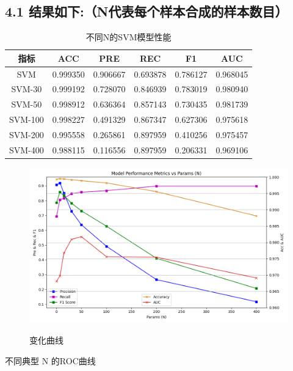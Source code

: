 \documentclass[8pt]{article}
\begin{document}
\subsection*{4.1 结果如下:（N代表每个样本合成的样本数目）}
\begin{table}[H]
    \centering
    \caption{不同N的SVM模型性能}
    \begin{tabular}{cccccc}
    \toprule
    指标 & ACC & PRE & REC & F1 & AUC \\
    \midrule
    SVM & 0.999350 & 0.906667 & 0.693878 & 0.786127 & 0.968045\\
    \midrule
    SVM-30 & 0.999192 & 0.728070 & 0.846939 & 0.783019 & 0.980940\\
    \midrule
    SVM-50 & 0.998912 & 0.636364 & 0.857143 & 0.730435 & 0.981739\\
    \midrule
    SVM-100 & 0.998227 & 0.491329 & 0.867347 & 0.627306 & 0.975618\\
    \midrule
    SVM-200 & 0.995558 & 0.265861 & 0.897959 & 0.410256 & 0.975457\\
    \midrule
    SVM-400 & 0.988115 & 0.116556 & 0.897959 & 0.206331 & 0.969106\\
    \bottomrule
    \end{tabular}
\end{table}
\begin{figure}[H]
    \centering
    \begin{minipage}{0.55\textwidth}
        \centering
        \includegraphics[width=\textwidth]{../Prob1/out/rand_seed_14/task3/Metrics_curve_N_0_7_15_30_50_100_200_400.png}
        \label{fig:Metrics_curve_N_0_7_15_30_50_100_200_400}
        \caption{变化曲线}
    \end{minipage}
\end{figure}
不同典型 N 的ROC曲线
\end{document}
